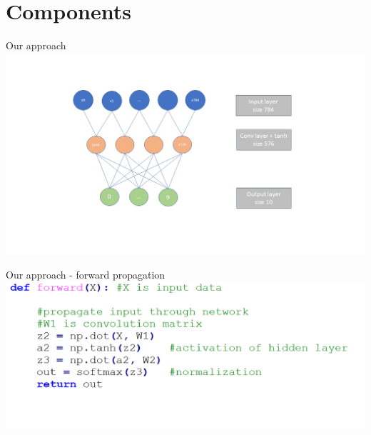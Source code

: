 \documentclass[12pt]{beamer}
\begin{document}
\section{Components}
\begin{frame}{Our approach}
\centering\includegraphics[width =1\linewidth]{images/ournet.jpg}



\end{frame}

\begin{frame}{Our approach - forward propagation}
\centering\includegraphics[width =1\linewidth]{images/forward.png}



\end{frame}
\end{document}
